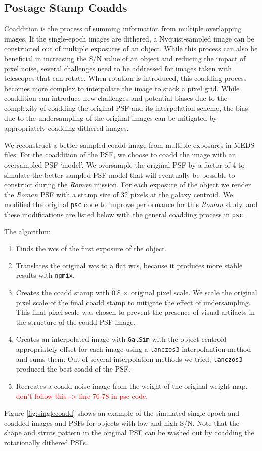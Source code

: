 \documentclass[fleqn,usenatbib]{mnras}
\begin{document}
\subsection{Postage Stamp Coadds}
\label{subsec:psc}
Coaddition is the process of summing information from multiple overlapping images. If the single-epoch images are dithered, a Nyquist-sampled image can be constructed out of multiple exposures of an object. While this process can also be beneficial in increasing the S/N value of an object and reducing the impact of pixel noise, several challenges need to be addressed for images taken with telescopes that can rotate. When rotation is introduced, this coadding process becomes more complex to interpolate the image to stack a pixel grid. While coaddition can introduce new challenges and potential biases due to the complexity of coadding the original PSF and its interpolation scheme, the bias due to the undersampling of the original images can be mitigated by appropriately coadding dithered images. 

We reconstruct a better-sampled coadd image from multiple exposures in MEDS files. For the coaddition of the PSF, we choose to coadd the image with an oversampled PSF `model'. We oversample the original PSF by a factor of 4 to simulate the better sampled PSF model that will eventually be possible to construct during the \emph{Roman} mission. For each exposure of the object we render the \emph{Roman} PSF with a stamp size of 32 pixels at the galaxy centroid. We modified the original \texttt{psc} code to improve performance for this \emph{Roman} study, and these modifications are listed below with the general coadding process in \texttt{psc}. 

The algorithm: 
\begin{enumerate}
    \setlength\itemsep{1em}
    \item Finds the wcs of the first exposure of the object.
    \item Translates the original wcs to a flat wcs, because it produces more stable results with \texttt{ngmix}.
    \item Creates the coadd stamp with 0.8 $\times$ original pixel scale. We scale the original pixel scale of the final coadd stamp to mitigate the effect of undersampling. This final pixel scale was chosen to prevent the presence of visual artifacts in the structure of the coadd PSF image. 
    \item Creates an interpolated image with \texttt{GalSim} with the object centroid appropriately offset for each image using a \texttt{lanczos3} interpolantion method and sums them. Out of several interpolation methods we tried, \texttt{lanczos3} produced the best coadd of the PSF.
    \item Recreates a coadd noise image from the weight of the original weight map. \textcolor{red}{don't follow this -> line 76-78 in psc code.}
\end{enumerate}
Figure \ref{fig:singlecoadd} shows an example of the simulated single-epoch and coadded images and PSFs for objects with low and high S/N. Note that the shape and struts pattern in the original PSF can be washed out by coadding the rotationally dithered PSFs. 
\end{document}
